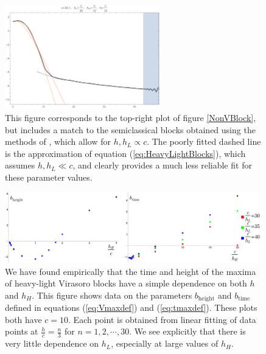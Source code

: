 \begin{subappendices}
\begin{figure}
\centering{}\includegraphics[width=0.6\textwidth]{virasoro_chapter/NonVacSemiVSFull}
\caption[Illustration of a poor approximation for a semiclassical non-vacuum Virasoro block]{This figure corresponds to the top-right plot of figure \ref{NonVBlock}, but includes a match to the semiclassical blocks obtained using the methods of \cite{Fitzpatrick:2016mjq}, which allow for $h, h_L \propto c$.  The poorly fitted dashed line is the approximation of equation (\ref{eq:HeavyLightBlocks}), which assumes $h, h_L \ll c$, and clearly provides a much less reliable fit for these parameter values.}
\label{fig:NonVacSemiVSFull}
\end{figure}



\begin{figure}[h]
\begin{centering}
\includegraphics[width=0.99\textwidth]{virasoro_chapter/bparameterdata}
\caption[Effects of varying $h_L$ on the size and location of the peaks in the Virasoro blocks]{ We have found empirically that the time and height of the maxima of heavy-light Virasoro blocks have a simple dependence on both $h$ and $h_H$.  This figure shows data on the parameters $b_\text{height}$ and $b_\text{time}$ defined in equations (\ref{eq:Vmaxdef}) and (\ref{eq:tmaxdef}).  These plots both have $c=10$. Each point is obtained from linear fitting of data points at $\frac{h}{c} = \frac{n}{3}$ for $n = 1, 2, \cdots, 30$.    We see explicitly that there is very little dependence on $h_L$, especially at large values of $h_H$. }
\label{fig:bparameterdata}
\end{centering}
\end{figure}



\end{subappendices}

